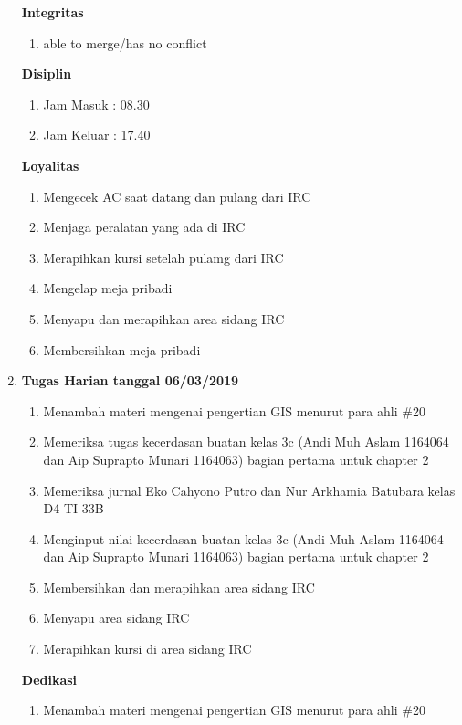 \begin{enumerate}
\textbf{Integritas}
\begin{enumerate}
\item able to merge/has no conflict
\end{enumerate}


\textbf{Disiplin}
\begin{enumerate}
\item Jam Masuk : 08.30
\item Jam Keluar : 17.40
\end{enumerate}


\textbf{Loyalitas}
\begin{enumerate}
\item Mengecek AC saat datang dan pulang dari IRC
\item Menjaga peralatan yang ada di IRC
\item Merapihkan kursi setelah pulamg dari IRC
\item Mengelap meja pribadi
\item Menyapu dan merapihkan area sidang IRC
\item Membersihkan meja pribadi
\end{enumerate}

\item \textbf{Tugas Harian tanggal 06/03/2019}
\begin{enumerate}
\item Menambah materi mengenai pengertian GIS menurut para ahli \#20
\item Memeriksa tugas kecerdasan buatan kelas 3c (Andi Muh Aslam 1164064 dan Aip Suprapto Munari 1164063) bagian pertama untuk chapter 2
\item Memeriksa jurnal Eko Cahyono Putro dan Nur Arkhamia Batubara kelas D4 TI 33B
\item Menginput nilai kecerdasan buatan kelas 3c (Andi Muh Aslam 1164064 dan Aip Suprapto Munari 1164063) bagian pertama untuk chapter 2
\item Membersihkan dan merapihkan area sidang IRC
\item Menyapu area sidang IRC
\item Merapihkan kursi di area sidang IRC
\end{enumerate}

\textbf{Dedikasi}
\begin{enumerate}
\item Menambah materi mengenai pengertian GIS menurut para ahli \#20
\end{enumerate}


\end{enumerate}
